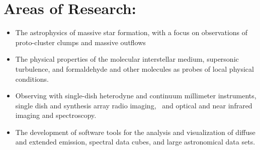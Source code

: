 \section*{Areas of Research: }
\begin{itemize}
    \item The astrophysics of massive star formation, with a focus on
        observations of proto-cluster clumps and massive outflows
    \item The physical properties of the molecular interstellar medium,
        supersonic turbulence, and formaldehyde and other molecules as probes
        of local physical conditions. 
    \item Observing with single-dish heterodyne and continuum millimeter
        instruments, single dish and synthesis array radio imaging,  and
        optical and near infrared imaging and spectroscopy. 
    \item The development of software tools for the analysis and visualization
        of diffuse and extended emission, spectral data cubes, and large
        astronomical data sets.
\end{itemize}


